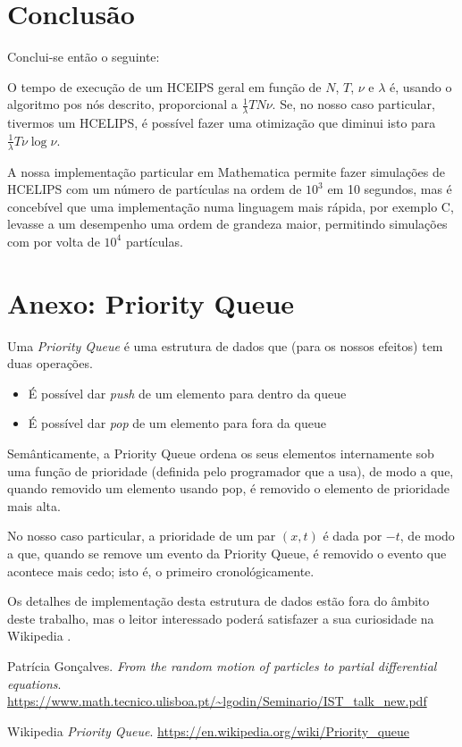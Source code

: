 \documentclass{article}
\begin{document}
	\section{Conclusão}
	
	Conclui-se então o seguinte:
	
	O tempo de execução de um HCEIPS geral em função de $N$, $T$, $\nu$ e $\lambda$ é, usando o algoritmo pos nós descrito, proporcional a $\frac 1 \lambda T N \nu$. Se, no nosso caso particular, tivermos um HCELIPS, é possível fazer uma otimização que diminui isto para $\frac 1 \lambda T \nu \log \nu$.
	
	A nossa implementação particular em Mathematica permite fazer simulações de HCELIPS com um número de partículas na ordem de $10^3$ em 10 segundos, mas é concebível que uma implementação numa linguagem mais rápida, por exemplo C, levasse a um desempenho uma ordem de grandeza maior, permitindo simulações com por volta de $10^4$ partículas.
	
	\section{Anexo: Priority Queue}
	
	Uma \emph{Priority Queue} é uma estrutura de dados que (para os nossos efeitos) tem duas operações.
	
	\begin{itemize}
	\item É possível dar \emph{push} de um elemento para dentro da queue
	
	\item É possível dar \emph{pop} de um elemento para fora da queue
	\end{itemize}
	
	Semânticamente, a Priority Queue ordena os seus elementos internamente sob uma função de prioridade (definida pelo programador que a usa), de modo a que, quando removido um elemento usando pop, é removido o elemento de prioridade mais alta.
	
	No nosso caso particular, a prioridade de um par $(x, t)$ é dada por $-t$, de modo a que, quando se remove um evento da Priority Queue, é removido o evento que acontece mais cedo; isto é, o primeiro cronológicamente.
	
	Os detalhes de implementação desta estrutura de dados estão fora do âmbito deste trabalho, mas o leitor interessado poderá satisfazer a sua curiosidade na Wikipedia \cite{wiki}. 
	
	

\begin{thebibliography}{9}
Patrícia Gonçalves. 
\textit{From the random motion of particles to partial differential equations}. 
\url{https://www.math.tecnico.ulisboa.pt/~lgodin/Seminario/IST_talk_new.pdf}
 
Wikipedia
\textit{Priority Queue}.
\url{https://en.wikipedia.org/wiki/Priority_queue}
\end{thebibliography}
\end{document}
